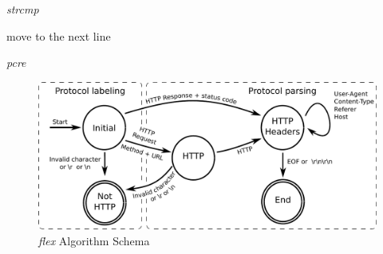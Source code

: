 \noindent\hspace{1pt}
\begin{minipage}[t]{(0.49\textwidth)-2pt}
\begin{algorithm}[H]
\caption{\emph{strcmp} }
\label{alg:strcmp}
{\fontsize{8}{10}\selectfont
\begin{algorithmic}[1]
                \ENDIF
            \ENDFOR
            \STATE move to the next line
        \ENDWHILE
    \ELSE 
    \ENDIF
\end{algorithmic}
}
\end{algorithm}
\end{minipage}%
\hfill
\begin{minipage}[t]{0.47\textwidth}
\begin{algorithm}[H]
\caption{\emph{pcre}}
\label{alg:pcre}
{\fontsize{8}{10}\selectfont
\begin{algorithmic}[1]
            \ENDIF
        \ENDFOR
    \ELSE 
    \ENDIF
\end{algorithmic}
}
\end{algorithm}
\end{minipage}

\begin{figure}[!ht]
        \centering
        \includegraphics[width=\textwidth]{figures/paper-http/flex_schema}
        \caption{\emph{flex} Algorithm Schema}
        \label{fig:flex_schema}
\end{figure}

